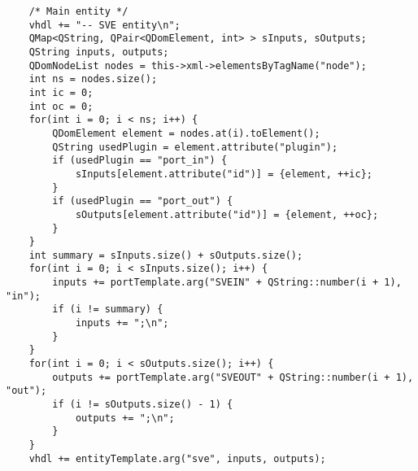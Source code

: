 \begin{lstlisting}
    /* Main entity */
    vhdl += "-- SVE entity\n";
    QMap<QString, QPair<QDomElement, int> > sInputs, sOutputs;
    QString inputs, outputs;
    QDomNodeList nodes = this->xml->elementsByTagName("node");
    int ns = nodes.size();
    int ic = 0;
    int oc = 0;
    for(int i = 0; i < ns; i++) {
        QDomElement element = nodes.at(i).toElement();
        QString usedPlugin = element.attribute("plugin");
        if (usedPlugin == "port_in") {
            sInputs[element.attribute("id")] = {element, ++ic};
        }
        if (usedPlugin == "port_out") {
            sOutputs[element.attribute("id")] = {element, ++oc};
        }
    }
    int summary = sInputs.size() + sOutputs.size();
    for(int i = 0; i < sInputs.size(); i++) {
        inputs += portTemplate.arg("SVEIN" + QString::number(i + 1), "in");
        if (i != summary) {
            inputs += ";\n";
        }
    }
    for(int i = 0; i < sOutputs.size(); i++) {
        outputs += portTemplate.arg("SVEOUT" + QString::number(i + 1), "out");
        if (i != sOutputs.size() - 1) {
            outputs += ";\n";
        }
    }
    vhdl += entityTemplate.arg("sve", inputs, outputs);


\end{lstlisting}
